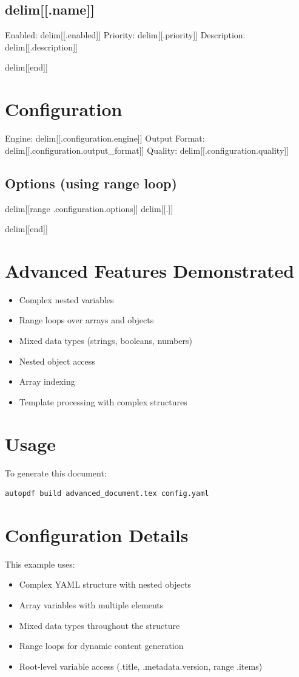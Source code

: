 \documentclass{article}
\begin{document}
\subsection{delim[[.name]]}
Enabled: delim[[.enabled]]
Priority: delim[[.priority]]
Description: delim[[.description]]\par
delim[[end]]

\section{Configuration}
Engine: delim[[.configuration.engine]]
Output Format: delim[[.configuration.output_format]]
Quality: delim[[.configuration.quality]]

\subsection{Options (using range loop)}
delim[[range .configuration.options]]
delim[[.]]\par
delim[[end]]

\section{Advanced Features Demonstrated}
\begin{itemize}
\item Complex nested variables
\item Range loops over arrays and objects
\item Mixed data types (strings, booleans, numbers)
\item Nested object access
\item Array indexing
\item Template processing with complex structures
\end{itemize}

\section{Usage}
To generate this document:
\begin{verbatim}
autopdf build advanced_document.tex config.yaml
\end{verbatim}

\section{Configuration Details}
This example uses:
\begin{itemize}
\item Complex YAML structure with nested objects
\item Array variables with multiple elements
\item Mixed data types throughout the structure
\item Range loops for dynamic content generation
\item Root-level variable access (.title, .metadata.version, range .items)
\end{itemize}
\end{document}
